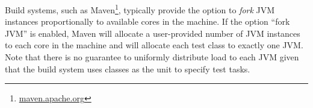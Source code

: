 
Build systems, such as Maven\footnote{\url{maven.apache.org}},
typically provide the option to \emph{fork} JVM instances
proportionally to available cores in the machine.  If the option
``fork JVM'' is enabled, Maven will allocate a user-provided number of
JVM instances to each core in the machine and will allocate each test
class to exactly one JVM.  Note that there is no guarantee to
uniformly distribute load to each JVM given that the build system uses
classes as the unit to specify test tasks.
